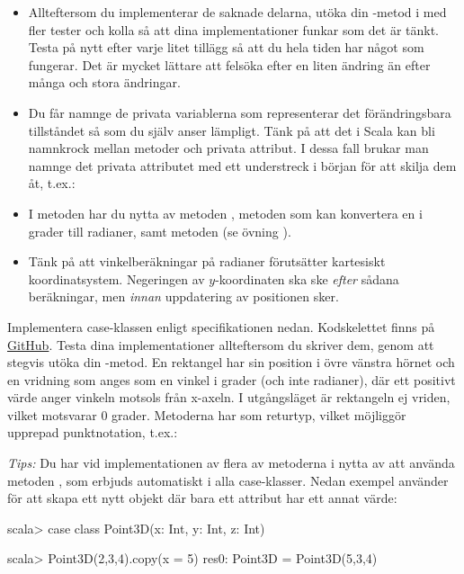 \begin{itemize}
\item Allteftersom du implementerar de saknade delarna, utöka din -metod i  med fler tester och kolla så att dina implementationer funkar som det är tänkt. Testa på nytt efter varje litet tillägg så att du hela tiden har något som fungerar. Det är mycket lättare att felsöka efter en liten ändring än efter många och stora ändringar.

\item Du får namnge de privata variablerna som representerar det förändringsbara tillståndet så som du själv anser lämpligt. Tänk på att det i Scala kan bli namnkrock mellan metoder och privata attribut. I dessa fall brukar man namnge det privata attributet med ett understreck i början för att skilja dem åt, t.ex.: \\

\item I metoden  har du nytta av metoden , metoden  som kan konvertera en  i grader till radianer, samt metoden  (se övning \texttt{\ExeWeekFIVE}).

\item Tänk på att vinkelberäkningar på radianer förutsätter kartesiskt koordinatsystem. Negeringen av $y$-koordinaten ska ske \emph{efter} sådana beräkningar, men \emph{innan} uppdatering av positionen sker.

\end{itemize}


\Task Implementera case-klassen  enligt specifikationen nedan. Kodskelettet finns på  \href{https://github.com/lunduniversity/introprog/blob/master/workspace/w05_turtle/src/main/scala/graphics/Rect.scala}{GitHub}. Testa dina implementationer allteftersom du skriver dem, genom att stegvis utöka din -metod.
En rektangel har sin position  i övre vänstra hörnet och en vridning  som anges som en vinkel i grader  (och inte radianer), där ett positivt värde anger vinkeln motsols från x-axeln.
I utgångsläget är rektangeln ej vriden, vilket motsvarar $0$ grader.
Metoderna har  som returtyp, vilket möjliggör upprepad punktnotation, t.ex.:\\


\emph{Tips:} Du har vid implementationen av flera av metoderna i  nytta av att använda metoden , som erbjuds automatiskt i alla case-klasser. Nedan exempel använder  för att skapa ett nytt objekt där bara ett attribut har ett annat värde:
\begin{REPLnonum}
scala> case class Point3D(x: Int, y: Int, z: Int)

scala> Point3D(2,3,4).copy(x = 5)
res0: Point3D = Point3D(5,3,4)
\end{REPLnonum}


